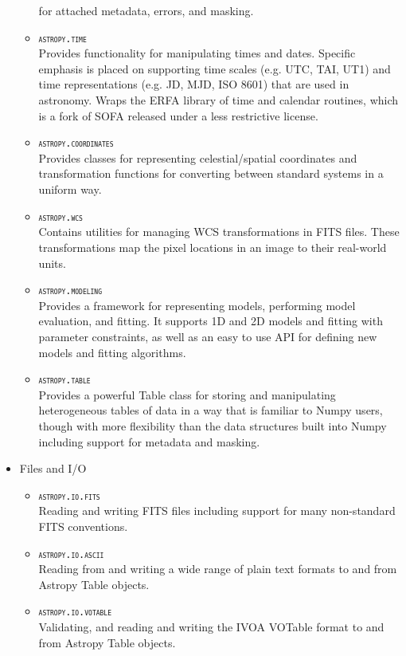 \documentclass{iau}
\begin{document}
\begin{itemize}
\begin{itemize}
      for attached metadata, errors, and masking.
    \item \textsc{\texttt{astropy.time}}\\
      Provides functionality for manipulating times and dates. Specific emphasis
      is placed on supporting time scales (e.g. UTC, TAI, UT1) and time
      representations (e.g. JD, MJD, ISO 8601) that are used in astronomy. Wraps
      the ERFA library of time and calendar routines, which is a fork of SOFA
      released under a less restrictive license.
    \item \textsc{\texttt{astropy.coordinates}}\\
      Provides classes for representing celestial/spatial coordinates and
      transformation functions for converting between standard systems in a
      uniform way.
    \item \textsc{\texttt{astropy.wcs}}\\
      Contains utilities for managing WCS transformations in FITS files. These
      transformations map the pixel locations in an image to their real-world
      units.
    \item \textsc{\texttt{astropy.modeling}}\\
      Provides a framework for representing models, performing model evaluation,
      and fitting. It supports 1D and 2D models and fitting with parameter
      constraints, as well as an easy to use API for defining new models and
      fitting algorithms.
    \item \textsc{\texttt{astropy.table}}\\
      Provides a powerful Table class for storing and manipulating heterogeneous
      tables of data in a way that is familiar to Numpy users, though with more
      flexibility than the data structures built into Numpy including support for
      metadata and masking.
  \end{itemize}
  \item Files and I/O
  \begin{itemize}
    \item \textsc{\texttt{astropy.io.fits}}\\
      Reading and writing FITS files including support for many non-standard FITS
      conventions.
    \item \textsc{\texttt{astropy.io.ascii}}\\
      Reading from and writing a wide range of plain text formats to and from
      Astropy Table objects.
    \item \textsc{\texttt{astropy.io.votable}}\\
      Validating, and reading and writing the IVOA VOTable format to and from
      Astropy Table objects.
  \end{itemize}
\end{itemize}
\end{document}
